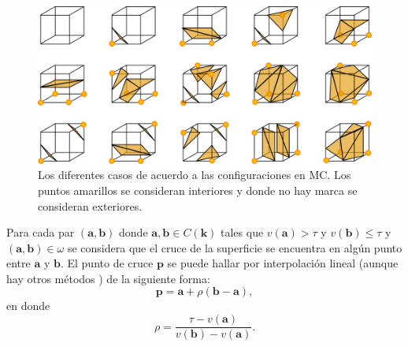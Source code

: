\begin{figure}[htp]
 \centering
  \includegraphics[scale=1.0]{img/cap01/mcCasos}
  \caption[Diferentes situaciones en el algoritmo de Marching Cubes]{Los diferentes casos de acuerdo a las configuraciones en MC. Los puntos amarillos se consideran interiores y donde no hay marca se consideran exteriores.}
  \label{fig:mcCasos}
\end{figure}

Para cada par $(\textbf{a}, \textbf{b})$ donde $\textbf{a}, \textbf{b} \in C(\textbf{k})$ tales que $v(\textbf{a}) > \tau$ y $v(\textbf{b}) \leq \tau$ y $(\textbf{a}, \textbf{b}) \in \omega$ se considera que el cruce de la superficie se encuentra en algún punto entre $\textbf{a}$ y $\textbf{b}$. El punto de cruce $\textbf{p}$ se puede hallar por interpolación lineal (aunque hay otros métodos \cite{mcResumen}) de la siguiente forma:
\begin{equation}
 \textbf{p} = \textbf{a} + \rho (\textbf{b} - \textbf{a}),
\label{ec:intepLineal}
\end{equation} en donde \begin{equation}
\rho = \dfrac{\tau - v(\textbf{a})}{v(\textbf{b}) - v(\textbf{a})}.
\label{ec:coefParaintepLineal}
\end{equation}

